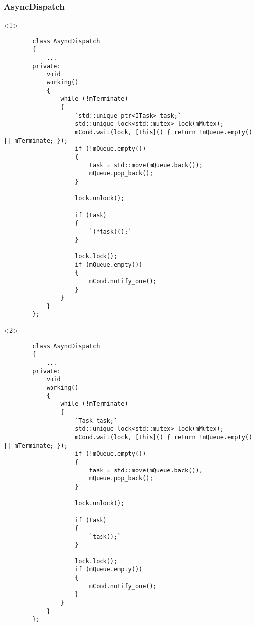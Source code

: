 \documentclass{beamer}
\begin{document}
\begin{frame}[fragile]
\frametitle{AsyncDispatch}
    \begin{onlyenv}<1>
    \begin{lstlisting}
        class AsyncDispatch
        {
            ...
        private:
            void
            working()
            {
                while (!mTerminate)
                {
                    `std::unique_ptr<ITask> task;`
                    std::unique_lock<std::mutex> lock(mMutex);
                    mCond.wait(lock, [this]() { return !mQueue.empty() || mTerminate; });
                    if (!mQueue.empty())
                    {
                        task = std::move(mQueue.back());
                        mQueue.pop_back();
                    }

                    lock.unlock();

                    if (task)
                    {
                        `(*task)();`
                    }

                    lock.lock();
                    if (mQueue.empty())
                    {
                        mCond.notify_one();
                    }
                }
            }
        };
    \end{lstlisting}
    \end{onlyenv}

    \begin{onlyenv}<2>
    \begin{lstlisting}
        class AsyncDispatch
        {
            ...
        private:
            void
            working()
            {
                while (!mTerminate)
                {
                    `Task task;`
                    std::unique_lock<std::mutex> lock(mMutex);
                    mCond.wait(lock, [this]() { return !mQueue.empty() || mTerminate; });
                    if (!mQueue.empty())
                    {
                        task = std::move(mQueue.back());
                        mQueue.pop_back();
                    }

                    lock.unlock();

                    if (task)
                    {
                        `task();`
                    }

                    lock.lock();
                    if (mQueue.empty())
                    {
                        mCond.notify_one();
                    }
                }
            }
        };
    \end{lstlisting}
    \end{onlyenv}
\end{frame}
\end{document}
